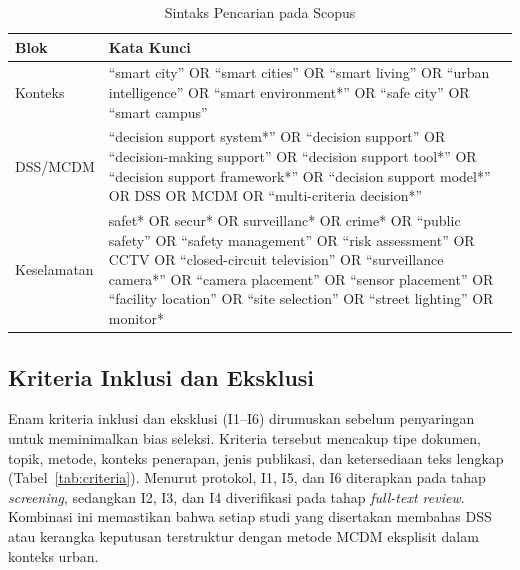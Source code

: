 \documentclass[10pt,twocolumn,a4paper]{article}
\begin{document}
\begin{table}[!t]
\centering
\caption{Sintaks Pencarian pada Scopus}\label{tab:search}
\footnotesize
\begin{tabularx}{\textwidth}{@{}l>{\raggedright\arraybackslash}X@{}}
\toprule
Blok & Kata Kunci \\
\midrule
Konteks & ``smart city'' OR ``smart cities'' OR ``smart living'' OR ``urban intelligence'' OR ``smart environment*'' OR ``safe city'' OR ``smart campus'' \\
DSS/MCDM & ``decision support system*'' OR ``decision support'' OR ``decision-making support'' OR ``decision support tool*'' OR ``decision support framework*'' OR ``decision support model*'' OR DSS OR MCDM OR ``multi-criteria decision*'' \\
Keselamatan & safet* OR secur* OR surveillanc* OR crime* OR ``public safety'' OR ``safety management'' OR ``risk assessment'' OR CCTV OR ``closed-circuit television'' OR ``surveillance camera*'' OR ``camera placement'' OR ``sensor placement'' OR ``facility location'' OR ``site selection'' OR ``street lighting'' OR monitor* \\
\bottomrule
\end{tabularx}
\end{table}

\subsection{Kriteria Inklusi dan Eksklusi}
Enam kriteria inklusi dan eksklusi (I1--I6) dirumuskan sebelum penyaringan untuk meminimalkan bias seleksi. Kriteria tersebut mencakup tipe dokumen, topik, metode, konteks penerapan, jenis publikasi, dan ketersediaan teks lengkap (Tabel~\ref{tab:criteria}). Menurut protokol, I1, I5, dan I6 diterapkan pada tahap \textit{screening}, sedangkan I2, I3, dan I4 diverifikasi pada tahap \textit{full-text review}. Kombinasi ini memastikan bahwa setiap studi yang disertakan membahas DSS atau kerangka keputusan terstruktur dengan metode MCDM eksplisit dalam konteks urban.
\end{document}

